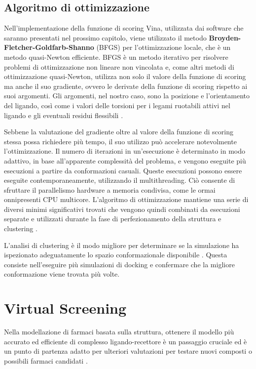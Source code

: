 \subsection{Algoritmo di ottimizzazione} \label{bfgs}
Nell'implementazione della funzione di scoring Vina, utilizzata dai software che saranno presentati nel prossimo capitolo, viene utilizzato il metodo \textbf{Broyden-Fletcher-Goldfarb-Shanno} (BFGS) per l'ottimizzazione locale, che è un metodo quasi-Newton efficiente. 
BFGS è un metodo iterativo per risolvere problemi di ottimizzazione non lineare non vincolata e, come altri metodi di ottimizzazione quasi-Newton, utilizza non solo il valore della funzione di scoring ma anche il suo gradiente, ovvero le derivate della funzione di scoring rispetto ai suoi argomenti. Gli argomenti, nel nostro caso, sono la posizione e l'orientamento del ligando, così come i valori delle torsioni per i legami ruotabili attivi nel ligando e gli eventuali residui flessibili \cite{trott_autodock_2009}.

Sebbene la valutazione del gradiente oltre al valore della funzione di scoring stessa possa richiedere più tempo, il suo utilizzo può accelerare notevolmente l'ottimizzazione. Il numero di iterazioni in un'esecuzione è determinato in modo adattivo, in base all'apparente complessità del problema, e vengono eseguite più esecuzioni a partire da conformazioni casuali. Queste esecuzioni possono essere eseguite contemporaneamente, utilizzando il multithreading. Ciò consente di sfruttare il parallelismo hardware a memoria condivisa, come le ormai onnipresenti CPU multicore. L'algoritmo di ottimizzazione mantiene una serie di diversi minimi significativi trovati che vengono quindi combinati da esecuzioni separate e utilizzati durante la fase di perfezionamento della struttura e clustering \cite{trott_autodock_2009}.

L'analisi di clustering è il modo migliore per determinare se la simulazione ha ispezionato adeguatamente lo spazio conformazionale disponibile \cite{forli_computational_2016}. Questa consiste nell'eseguire più simulazioni di docking e confermare che la migliore conformazione viene trovata più volte.

\section{Virtual Screening}
Nella modellazione di farmaci basata sulla struttura, ottenere il modello più accurato ed efficiente di complesso ligando-recettore è un passaggio cruciale ed è un punto di partenza adatto per ulteriori valutazioni per testare nuovi composti o possibili farmaci candidati \cite{menchaca_past_2020}.
 
